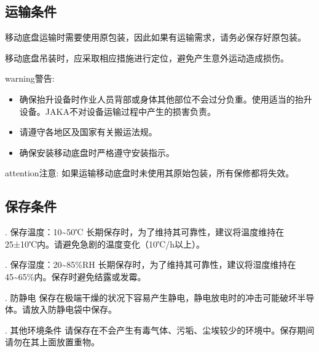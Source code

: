 \documentclass[a4paper,11pt,english,openany,oneside]{sphinxmanual}
\begin{document}
\subsection{运输条件}
\label{\detokenize{08 _u5b89_u88c5_u4e0e_u8c03_u8bd5:id5}}\label{\detokenize{08 _u5b89_u88c5_u4e0e_u8c03_u8bd5:id6}}
\sphinxAtStartPar
移动底盘运输时需要使用原包装，因此如果有运输需求，请务必保存好原包装。

\sphinxAtStartPar
移动底盘吊装时，应采取相应措施进行定位，避免产生意外运动造成损伤。

\begin{sphinxadmonition}{warning}{警告:}\begin{itemize}
\item {} 
\sphinxAtStartPar
确保抬升设备时作业人员背部或身体其他部位不会过分负重。使用适当的抬升设备。JAKA不对设备运输过程中产生的损害负责。

\item {} 
\sphinxAtStartPar
请遵守各地区及国家有关搬运法规。

\item {} 
\sphinxAtStartPar
确保安装移动底盘时严格遵守安装指示。

\end{itemize}
\end{sphinxadmonition}

\begin{sphinxadmonition}{attention}{注意:}
\sphinxAtStartPar
如果运输移动底盘时未使用其原始包装，所有保修都将失效。
\end{sphinxadmonition}


\subsection{保存条件}
\label{\detokenize{08 _u5b89_u88c5_u4e0e_u8c03_u8bd5:id7}}\label{\detokenize{08 _u5b89_u88c5_u4e0e_u8c03_u8bd5:id8}}
.      保存温度：\sphinxhyphen{}10\textasciitilde{}50℃
长期保存时，为了维持其可靠性，建议将温度维持在25±10℃内。请避免急剧的温度变化（10℃/h以上）。

.      保存湿度：20\textasciitilde{}85\%RH
长期保存时，为了维持其可靠性，建议将湿度维持在45\textasciitilde{}65\%内。保存时避免结露或发霉。

.      防静电
保存在极端干燥的状况下容易产生静电，静电放电时的冲击可能破坏半导体。请放入防静电袋中保存。

.      其他环境条件
请保存在不会产生有毒气体、污垢、尘埃较少的环境中。保存期间请勿在其上面放置重物。
\end{document}
